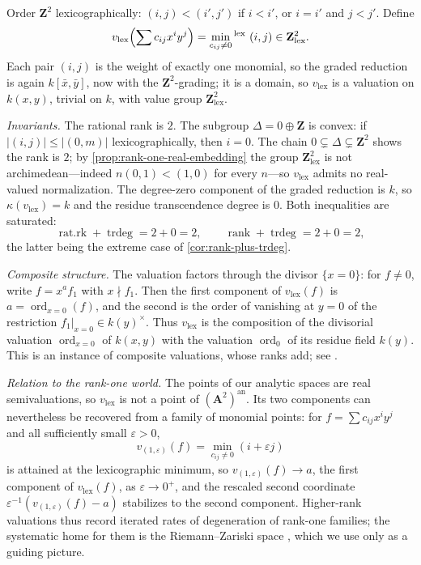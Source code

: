 \begin{example}
\label{ex:gallery-lex}
Order $\mathbf Z^2$ lexicographically:
$(i,j)<(i',j')$ if $i<i'$, or $i=i'$ and $j<j'$. Define
\[
 v_{\mathrm{lex}}\Bigl(\sum c_{ij}x^iy^j\Bigr)
 =\min_{c_{ij}\neq0}{}^{\mathrm{lex}}\ (i,j)\in\mathbf Z^2_{\mathrm{lex}} .
\]
Each pair $(i,j)$ is the weight of exactly one monomial, so the graded
reduction is again $k[\bar x,\bar y]$, now with the
$\mathbf Z^2$-grading; it is a domain, so $v_{\mathrm{lex}}$ is a
valuation on $k(x,y)$, trivial on $k$, with value group
$\mathbf Z^2_{\mathrm{lex}}$.

\emph{Invariants.} The rational rank is $2$. The subgroup
$\Delta=0\oplus\mathbf Z$ is convex: if
$|(i,j)|\leq|(0,m)|$ lexicographically, then $i=0$. The chain
$0\subsetneq\Delta\subsetneq\mathbf Z^2$ shows the rank is $2$; by
\cref{prop:rank-one-real-embedding} the group
$\mathbf Z^2_{\mathrm{lex}}$ is not archimedean---indeed
$n(0,1)<(1,0)$ for every $n$---so $v_{\mathrm{lex}}$ admits no
real-valued normalization. The degree-zero component of the graded
reduction is $k$, so $\kappa(v_{\mathrm{lex}})=k$ and the residue
transcendence degree is $0$. Both inequalities are saturated:
\[
 \operatorname{rat.rk}+\operatorname{trdeg}=2+0=2,
 \qquad
 \operatorname{rank}+\operatorname{trdeg}=2+0=2 ,
\]
the latter being the extreme case of \cref{cor:rank-plus-trdeg}.

\emph{Composite structure.} The valuation factors through the divisor
$\{x=0\}$: for $f\neq0$, write $f=x^af_1$ with $x\nmid f_1$. Then the
first component of $v_{\mathrm{lex}}(f)$ is
$a=\operatorname{ord}_{x=0}(f)$, and the second is the order of vanishing
at $y=0$ of the restriction
$f_1|_{x=0}\in k(y)^\times$. Thus $v_{\mathrm{lex}}$ is the composition
of the divisorial valuation $\operatorname{ord}_{x=0}$ of $k(x,y)$ with
the valuation $\operatorname{ord}_0$ of its residue field $k(y)$. This is
an instance of composite valuations, whose ranks add; see
\cite[Chapter~VI, \S10]{ZariskiSamuelII}.

\emph{Relation to the rank-one world.} The points of our analytic spaces
are real semivaluations, so $v_{\mathrm{lex}}$ is not a point of
$(\mathbf A^2)^{\mathrm{an}}$. Its two components can nevertheless be
recovered from a family of monomial points: for
$f=\sum c_{ij}x^iy^j$ and all sufficiently small
$\varepsilon>0$,
\[
 v_{(1,\varepsilon)}(f)=\min_{c_{ij}\neq0}(i+\varepsilon j)
\]
is attained at the lexicographic minimum, so
$v_{(1,\varepsilon)}(f)\to a$, the first component of
$v_{\mathrm{lex}}(f)$, as $\varepsilon\to0^+$, and the rescaled second
coordinate $\varepsilon^{-1}(v_{(1,\varepsilon)}(f)-a)$ stabilizes to the
second component. Higher-rank valuations thus record iterated rates of
degeneration of rank-one families; the systematic home for them is the
Riemann--Zariski space \cite{Tem11}, which we use only as a guiding
picture.
\end{example}

